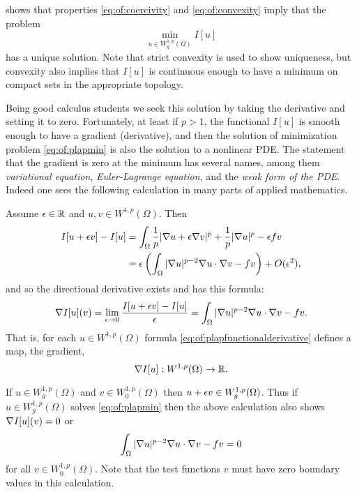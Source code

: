 \citet[Theorem 8.2.2]{Evans2010} shows that properties \eqref{eq:of:coercivity} and \eqref{eq:of:convexity} imply that the problem
\begin{equation}
\min_{u \in W_g^{1,p}(\Omega)} I[u] \label{eq:of:plapmin}
\end{equation}
has a unique solution.  Note that strict convexity is used to show uniqueness, but convexity also implies that $I[u]$ is continuous enough to have a minimum on compact sets in the appropriate topology. 

Being good calculus students we seek this solution by taking the derivative and setting it to zero.  Fortunately, at least if $p>1$, the functional $I[u]$ is smooth enough to have a gradient (derivative), and then the solution of minimization problem \eqref{eq:of:plapmin} is also the solution to a nonlinear PDE.  The statement that the gradient is zero at the minimum has several names, among them \emph{variational equation}, \emph{Euler-Lagrange equation}, and the \emph{weak form of the PDE}.  Indeed one sees the following calculation in many parts of applied mathematics.

Assume $\epsilon\in \mathbb{R}$ and $u,v \in W^{1,p}(\Omega)$.  Then
\begin{align*}
I[u+\epsilon v] - I[u] &= \int_\Omega \frac{1}{p} |\nabla u + \epsilon \nabla v|^p + \frac{1}{p} |\nabla u|^p - \epsilon f v \\
   &= \epsilon \left(\int_\Omega |\nabla u|^{p-2} \nabla u \cdot \nabla v - f v\right) + O(\epsilon^2),
\end{align*}
and so the directional derivative exists and has this formula:
\begin{equation}
\nabla I[u](v) = \lim_{\epsilon\to 0} \frac{I[u+\epsilon v] - I[u]}{\epsilon} = \int_\Omega |\nabla u|^{p-2} \nabla u \cdot \nabla v - f v. \label{eq:of:plapfunctionalderivative}
\end{equation}
That is, for each $u \in W^{1,p}(\Omega)$ formula \eqref{eq:of:plapfunctionalderivative} defines a map, the gradient,
   $$\nabla I[u] : W^{1,p}(\Omega) \to \mathbb{R}.$$

If $u \in W_g^{1,p}(\Omega)$ and $v\in W_0^{1,p}(\Omega)$ then $u+\epsilon v\in W_g^{1,p}(\Omega)$.  Thus if $u \in W_g^{1,p}(\Omega)$ solves \eqref{eq:of:plapmin} then the above calculation also shows $\nabla I[u](v)=0$ or
\begin{equation}
\int_\Omega |\nabla u|^{p-2} \nabla u \cdot \nabla v - f v = 0 \label{eq:of:plapweakform}
\end{equation}
for all $v\in W_0^{1,p}(\Omega)$.  Note that the test functions $v$ must have zero boundary values in this calculation.

